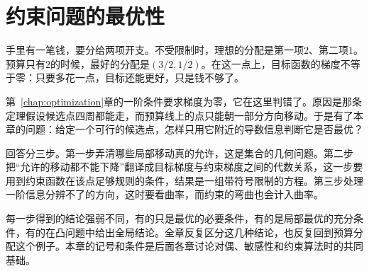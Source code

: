 \chapter{约束问题的最优性}
\label{chap:constrained-optimality}
\label{chap:constrained-optimization}

手里有一笔钱，要分给两项开支。不受限制时，理想的分配是第一项$2$、第二项$1$。预算只有$2$的时候，最好的分配是$(3/2,1/2)$。在这一点上，目标函数的梯度不等于零：只要多花一点，目标还能更好，只是钱不够了。

第~\ref{chap:optimization}章的一阶条件要求梯度为零，它在这里判错了。原因是那条定理假设候选点四周都能走，而预算线上的点只能朝一部分方向移动。于是有了本章的问题：给定一个可行的候选点，怎样只用它附近的导数信息判断它是否最优？

回答分三步。第一步弄清哪些局部移动真的允许，这是集合的几何问题。第二步把“允许的移动都不能下降”翻译成目标梯度与约束梯度之间的代数关系，这一步要用到约束函数在该点足够规则的条件，结果是一组带符号限制的方程。第三步处理一阶信息分辨不了的方向，这时要看曲率，而约束的弯曲也会计入曲率。

每一步得到的结论强弱不同，有的只是最优的必要条件，有的是局部最优的充分条件，有的在凸问题中给出全局结论。全章反复区分这几种结论，也反复回到预算分配这个例子。本章的记号和条件是后面各章讨论对偶、敏感性和约束算法时的共同基础。







